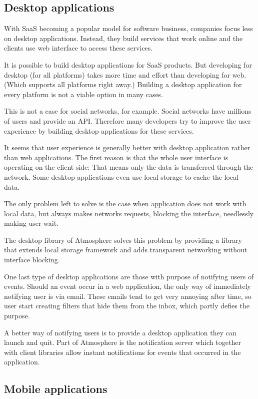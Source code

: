 \subsection{Desktop applications}

With SaaS becoming a popular model for software business, companies focus less on desktop applications. Instead, they build services that work online and the clients use web interface to access these services.

It is possible to build desktop applications for SaaS products. But developing for desktop (for all platforms) takes more time and effort than developing for web. (Which supports all platforms right away.) Building a desktop application for every platform is not a viable option in many cases.

This is not a case for social networks, for example. Social networks have millions of users and provide an API. Therefore many developers try to improve the user experience by building desktop applications for these services.

It seems that user experience is generally better with desktop application rather than web applications. The first reason is that the whole user interface is operating on the client side: That means only the data is transferred through the network. Some desktop applications even use local storage to cache the local data.

The only problem left to solve is the case when application does not work with local data, but always makes networks requests, blocking the interface, needlessly making user wait.

The desktop library of Atmosphere solves this problem by providing a library that extends local storage framework and adds transparent networking without interface blocking. 

One last type of desktop applications are those with purpose of notifying users of events. Should an event occur in a web application, the only way of immediately notifying user is via email. These emails tend to get very annoying after time, so user start creating filters that hide them from the inbox, which partly defies the purpose.

A better way of notifying users is to provide a desktop application they can launch and quit. Part of Atmosphere is the notification server which together with client libraries allow instant notifications for events that occurred in the application. 

\subsection{Mobile applications}

